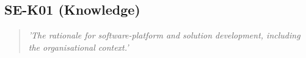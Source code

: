 \subsection*{SE-K01 (Knowledge)}

  \begin{quote}
    \textit{'The rationale for software-platform and solution
    development, including the organisational context.'}
  \end{quote}

\newpage